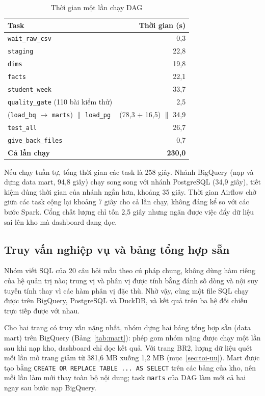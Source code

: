 \begin{table}[htbp]
\centering
\small
\begin{tabular}{|l|r|}
\hline
\textbf{Task} & \textbf{Thời gian (s)} \\ \hline
\texttt{wait\_raw\_csv} & 0,3 \\ \hline
\texttt{staging} & 22,8 \\ \hline
\texttt{dims} & 19,8 \\ \hline
\texttt{facts} & 22,1 \\ \hline
\texttt{student\_week} & 33,7 \\ \hline
\texttt{quality\_gate} (110 bài kiểm thử) & 2,5 \\ \hline
(\texttt{load\_bq} $\rightarrow$ \texttt{marts}) $\parallel$ \texttt{load\_pg} & (78,3 + 16,5) $\parallel$ 34,9 \\ \hline
\texttt{test\_all} & 26,7 \\ \hline
\texttt{give\_back\_files} & 0,7 \\ \hline
\textbf{Cả lần chạy} & \textbf{230,0} \\ \hline
\end{tabular}
\caption{Thời gian một lần chạy DAG}
\label{tab:airflow-thoi-gian}
\end{table}

Nếu chạy tuần tự, tổng thời gian các task là 258 giây. Nhánh BigQuery (nạp và dựng data mart,
94,8 giây) chạy song song với nhánh PostgreSQL (34,9 giây), tiết kiệm đúng thời gian của nhánh
ngắn hơn, khoảng 35 giây. Thời gian Airflow chờ giữa các task cộng lại khoảng 7 giây cho cả lần
chạy, không đáng kể so với các bước Spark. Cổng chất lượng chỉ tốn 2,5 giây nhưng ngăn được việc
đẩy dữ liệu sai lên kho mà dashboard đang đọc.

\subsection{Truy vấn nghiệp vụ và bảng tổng hợp sẵn}
\label{sec:truy-van}

Nhóm viết SQL của 20 câu hỏi mẫu theo cú pháp chung, không dùng hàm riêng của hệ quản trị nào; trung vị và phân vị được tính bằng đánh số dòng và nội suy tuyến tính thay vì các hàm phân vị đặc thù. Nhờ vậy, cùng một file SQL chạy được trên BigQuery, PostgreSQL và DuckDB, và kết quả
trên ba hệ đối chiếu trực tiếp được với nhau.

Cho hai trang có truy vấn nặng nhất, nhóm dựng hai bảng tổng hợp sẵn (data mart) trên BigQuery (Bảng~\ref{tab:mart}): phép gom nhóm nặng được chạy một lần sau khi nạp kho, dashboard chỉ đọc kết quả. Với trang BR2, lượng dữ liệu quét mỗi lần mở trang giảm từ 381,6 MB xuống 1,2 MB (mục~\ref{sec:toi-uu}). Mart được tạo bằng \texttt{CREATE OR REPLACE TABLE ... AS SELECT} trên các bảng của kho, nên mỗi lần làm mới thay toàn bộ nội dung; task \texttt{marts} của DAG làm mới
cả hai ngay sau bước nạp BigQuery.

